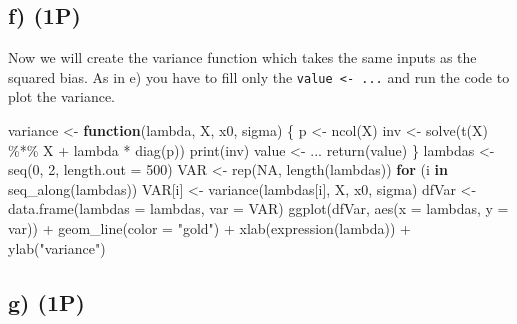 \documentclass[
]{article}
\newenvironment{Shaded}{\begin{snugshade}}{\end{snugshade}}
\newcommand{\AttributeTok}[1]{\textcolor[rgb]{0.77,0.63,0.00}{#1}}
\newcommand{\ConstantTok}[1]{\textcolor[rgb]{0.00,0.00,0.00}{#1}}
\newcommand{\ControlFlowTok}[1]{\textcolor[rgb]{0.13,0.29,0.53}{\textbf{#1}}}
\newcommand{\DecValTok}[1]{\textcolor[rgb]{0.00,0.00,0.81}{#1}}
\newcommand{\FunctionTok}[1]{\textcolor[rgb]{0.00,0.00,0.00}{#1}}
\newcommand{\NormalTok}[1]{#1}
\newcommand{\OtherTok}[1]{\textcolor[rgb]{0.56,0.35,0.01}{#1}}
\newcommand{\SpecialCharTok}[1]{\textcolor[rgb]{0.00,0.00,0.00}{#1}}
\newcommand{\StringTok}[1]{\textcolor[rgb]{0.31,0.60,0.02}{#1}}
\begin{document}
\hypertarget{f-1p}{%
\subsection{f) (1P)}\label{f-1p}}

Now we will create the variance function which takes the same inputs as
the squared bias. As in e) you have to fill only the
\texttt{value\ \textless{}-\ ...} and run the code to plot the variance.

\begin{Shaded}
\begin{Highlighting}[]
\NormalTok{variance }\OtherTok{\textless{}{-}} \ControlFlowTok{function}\NormalTok{(lambda, X, x0, sigma) \{}
\NormalTok{  p }\OtherTok{\textless{}{-}} \FunctionTok{ncol}\NormalTok{(X)}
\NormalTok{  inv }\OtherTok{\textless{}{-}} \FunctionTok{solve}\NormalTok{(}\FunctionTok{t}\NormalTok{(X) }\SpecialCharTok{\%*\%}\NormalTok{ X }\SpecialCharTok{+}\NormalTok{ lambda }\SpecialCharTok{*} \FunctionTok{diag}\NormalTok{(p))}
  \FunctionTok{print}\NormalTok{(inv)}
\NormalTok{  value }\OtherTok{\textless{}{-}}\NormalTok{ ...}
  \FunctionTok{return}\NormalTok{(value)}
\NormalTok{\}}
\NormalTok{lambdas }\OtherTok{\textless{}{-}} \FunctionTok{seq}\NormalTok{(}\DecValTok{0}\NormalTok{, }\DecValTok{2}\NormalTok{, }\AttributeTok{length.out =} \DecValTok{500}\NormalTok{)}
\NormalTok{VAR }\OtherTok{\textless{}{-}} \FunctionTok{rep}\NormalTok{(}\ConstantTok{NA}\NormalTok{, }\FunctionTok{length}\NormalTok{(lambdas))}
\ControlFlowTok{for}\NormalTok{ (i }\ControlFlowTok{in} \FunctionTok{seq\_along}\NormalTok{(lambdas)) VAR[i] }\OtherTok{\textless{}{-}} \FunctionTok{variance}\NormalTok{(lambdas[i], X, x0, sigma)}
\NormalTok{dfVar }\OtherTok{\textless{}{-}} \FunctionTok{data.frame}\NormalTok{(}\AttributeTok{lambdas =}\NormalTok{ lambdas, }\AttributeTok{var =}\NormalTok{ VAR)}
\FunctionTok{ggplot}\NormalTok{(dfVar, }\FunctionTok{aes}\NormalTok{(}\AttributeTok{x =}\NormalTok{ lambdas, }\AttributeTok{y =}\NormalTok{ var)) }\SpecialCharTok{+}
  \FunctionTok{geom\_line}\NormalTok{(}\AttributeTok{color =} \StringTok{"gold"}\NormalTok{) }\SpecialCharTok{+}
  \FunctionTok{xlab}\NormalTok{(}\FunctionTok{expression}\NormalTok{(lambda)) }\SpecialCharTok{+}
  \FunctionTok{ylab}\NormalTok{(}\StringTok{"variance"}\NormalTok{)}
\end{Highlighting}
\end{Shaded}

\hypertarget{g-1p}{%
\subsection{g) (1P)}\label{g-1p}}
\end{document}
